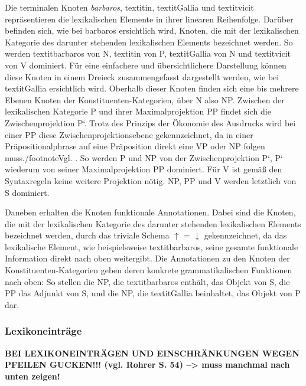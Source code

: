 \documentclass[12pt,a4paper]{article}
\begin{document}
Die terminalen Knoten \textit{barbaros}, textit{in}, textit{Gallia} und textit{vicit} repräsentieren die lexikalischen Elemente in ihrer linearen Reihenfolge. Darüber befinden sich, wie bei barbaros ersichtlich wird, Knoten, die mit der lexikalischen Kategorie des darunter stehenden lexikalischen Elements bezeichnet werden. So werden textit{barbaros} von N, textit{in} von P, textit{Gallia} von N und textit{vicit} von V dominiert. Für eine einfachere und übersichtlichere Darstellung können diese Knoten in einem Dreieck zusammengefasst dargestellt werden, wie bei textit{Gallia} ersichtlich wird. Oberhalb dieser Knoten finden sich eine bis mehrere Ebenen Knoten der Konstituenten-Kategorien, über N also NP. Zwischen der lexikalischen Kategorie P und ihrer Maximalprojektion PP findet sich die Zwischenprojektion P‘. Trotz des Prinzips der Ökonomie des Ausdrucks wird bei einer PP diese Zwischenprojektionsebene gekennzeichnet,  da in einer Präpositionalphrase auf eine Präposition direkt eine VP oder NP folgen muss./footnote{Vgl. \cite{Snijders}.} So werden P und NP von der Zwischenprojektion P‘, P‘ wiederum von seiner Maximalprojektion PP dominiert. Für V ist gemäß den Syntaxregeln keine weitere Projektion nötig. NP, PP und V werden letztlich von S dominiert.

Daneben erhalten die Knoten funktionale Annotationen. Dabei sind die Knoten, die mit der lexikalischen Kategorie des darunter stehenden lexikalischen Elements bezeichnet werden, durch das triviale Schema $\uparrow$ = $\downarrow$ gekennzeichnet, da das lexikalische Element, wie beispielsweise textit{barbaros}, seine gesamte funktionale Information direkt nach oben weitergibt. Die Annotationen zu den Knoten der Konstituenten-Kategorien geben deren konkrete grammatikalischen Funktionen nach oben: So stellen die NP, die textit{barbaros} enthält, das Objekt von S, die PP das Adjunkt von S, und die NP, die textit{Gallia} beinhaltet, das Objekt von P dar.


\subsubsection{Lexikoneinträge}

\textbf{BEI LEXIKONEINTRÄGEN UND EINSCHRÄNKUNGEN WEGEN PFEILEN GUCKEN!!! (vgl. Rohrer S. 54) --> muss manchmal nach unten zeigen!}
\end{document}
